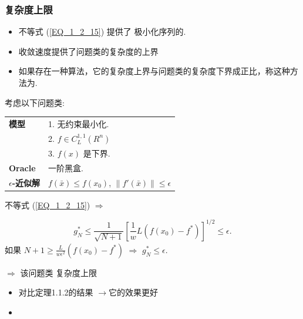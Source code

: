 \documentclass[handout]{beamer}
\begin{document}
\begin{frame}[allowframebreaks]
\frametitle{复杂度上限}

\begin{itemize}
 \item 不等式 (\ref{EQ_1_2_15}) 提供了  
极小化序列的.

\item 收敛速度提供了问题类的复杂度的上界

\item 如果存在一种算法，它的复杂度上界与问题类的复杂度下界成正比，称这种方法为.

\end{itemize}


\framebreak


\begin{example}\label{eg_1_2_3}

    考虑以下问题类:

    \begin{tabular}{|l|l|}
    \hline
    \textbf{模型} &   1. 无约束最小化. \\
        & 2.  $f\in C_{L}^{1,1}(R^n)$ \\
        & 3. $f(x)$ 是下界.   \\ \hline
   \textbf{Oracle} &
               一阶黑盒. \\ \hline
    \textbf{$\epsilon$-近似解} & $f(\bar{x}) \leq f(x_0)$, $\|f'(\bar{x}) \| \leq \epsilon$ \\ \hline
    \end{tabular}

\framebreak

不等式 (\ref{EQ_1_2_15})  $\Rightarrow$

$$
    g_{N}^{*} \leq \frac{1}{\sqrt{N+1}} \left[\frac{1}{w} L(f(x_0)-f^*) \right]_{}^{1/2}\leq \epsilon.
$$
  如果 $N+1 \geq \frac{L}{w\epsilon^2}(f(x_0)-f^*)$ $\Rightarrow$ $g_{N}^{*} \leq \epsilon$.

$\Rightarrow$ 该问题类 复杂度上限   
\begin{itemize}
\item 对比定理1.1.2的结果 $\rightarrow$它的效果更好 
\item {}
\end{itemize}
\end{example}


\end{frame}
\end{document}
